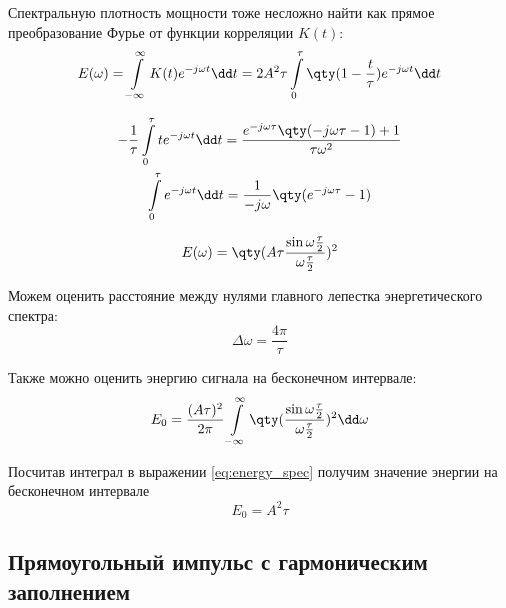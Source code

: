 Спектральную плотность мощности тоже несложно найти как прямое преобразование
Фурье от функции корреляции $K(t)$:
\begin{equation}
    \begin{gathered}
        E(\omega) = \int\limits_{-\infty}^{\infty} K(t) e^{-j\omega t} \dd t =
        2 A^2 \tau \int\limits_{0}^{\tau}  \qty(1- \frac{t}{\tau} )e^{-j \omega t}\dd t
    \end{gathered}
\end{equation}

\begin{equation}
    \begin{gathered}
        - \frac{1}{\tau}\int\limits_{0}^{\tau}  t e^{-j \omega t}\dd t = 
        \frac{e^{- j \omega \tau} \qty( - j \omega \tau - 1) + 1}{\tau\omega^2}
        \\
        \int\limits_{0}^{\tau}  e^{-j \omega t}\dd t = 
        \frac{1}{-j \omega} \qty(e^{-j\omega\tau} - 1)
    \end{gathered}
\end{equation}





\begin{equation}
    \label{eq:pdf}
    E(\omega) = \qty(A\tau \sinc{\omega \frac{\tau}{2}})^2
\end{equation}

Можем оценить расстояние между нулями главного лепестка энергетического спектра:
\begin{equation}
    \label{eq:DeltaW}
    \Delta \omega = \frac{4 \pi}{\tau}
\end{equation}


Также можно оценить энергию сигнала на бесконечном интервале:
 \begin{equation}
     \label{eq:energy_spec}
     E_0 = \frac{(A \tau)^2}{2\pi}
     \int\limits_{-\infty}^{\infty} \qty(\sinc{\omega \frac{\tau}{2}})^2 \dd
     \omega  
\end{equation}



Посчитав интеграл в выражении \eqref{eq:energy_spec} 
получим значение энергии на бесконечном интервале
\begin{equation}
     E_0 = A^2 \tau
\end{equation}


\subsection{Прямоугольный импульс с гармоническим заполнением}%
\label{sub:priamougol_nyi_impul_s_s_garmonicheskim_zapolneniem}


